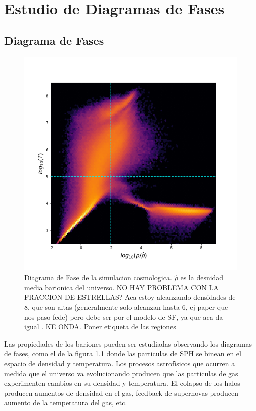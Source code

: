\chapter{Estudio de Diagramas de Fases}
\label{DF}





\section{Diagrama de Fases}
\begin{figure}
    \centering
    \includegraphics[width=14cm]{Figures/DF.png}
    \caption{Diagrama de Fase de la simulacion cosmologica. $\hat{\rho}$ es la desnidad media barionica del universo. NO HAY PROBLEMA CON LA FRACCION DE ESTRELLAS? Aca estoy alcanzando densidades de 8, que son altas (generalmente solo alcanzan hasta 6, ej paper que nos paso fede) pero debe ser por el modelo de SF, ya que aca da igual \citep{Springel2002}. KE ONDA. Poner etiqueta de las regiones}
    \label{DF}
\end{figure}{}

Las propiedades de los bariones pueden ser estudiadas observando los diagramas de fases, como el de la figura \ref{DF} donde las particulas de SPH se binean en el espacio de densidad y temperatura. Los procesos astrof\'isicos que ocurren a medida que el universo va evolucionando producen que las particulas de gas experimenten cambios en su densidad y temperatura. El colapso de los halos producen aumentos de densidad en el gas, feedback de supernovas producen aumento de la temperatura del gas, etc. 

